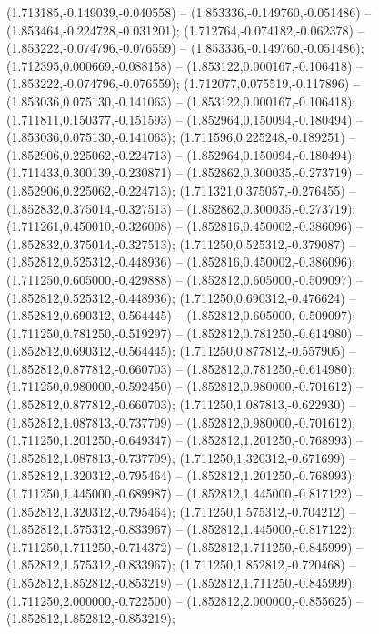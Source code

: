  (1.713185,-0.149039,-0.040558) -- (1.853336,-0.149760,-0.051486) -- (1.853464,-0.224728,-0.031201);
 (1.712764,-0.074182,-0.062378) -- (1.853222,-0.074796,-0.076559) -- (1.853336,-0.149760,-0.051486);
 (1.712395,0.000669,-0.088158) -- (1.853122,0.000167,-0.106418) -- (1.853222,-0.074796,-0.076559);
 (1.712077,0.075519,-0.117896) -- (1.853036,0.075130,-0.141063) -- (1.853122,0.000167,-0.106418);
 (1.711811,0.150377,-0.151593) -- (1.852964,0.150094,-0.180494) -- (1.853036,0.075130,-0.141063);
 (1.711596,0.225248,-0.189251) -- (1.852906,0.225062,-0.224713) -- (1.852964,0.150094,-0.180494);
 (1.711433,0.300139,-0.230871) -- (1.852862,0.300035,-0.273719) -- (1.852906,0.225062,-0.224713);
 (1.711321,0.375057,-0.276455) -- (1.852832,0.375014,-0.327513) -- (1.852862,0.300035,-0.273719);
 (1.711261,0.450010,-0.326008) -- (1.852816,0.450002,-0.386096) -- (1.852832,0.375014,-0.327513);
 (1.711250,0.525312,-0.379087) -- (1.852812,0.525312,-0.448936) -- (1.852816,0.450002,-0.386096);
 (1.711250,0.605000,-0.429888) -- (1.852812,0.605000,-0.509097) -- (1.852812,0.525312,-0.448936);
 (1.711250,0.690312,-0.476624) -- (1.852812,0.690312,-0.564445) -- (1.852812,0.605000,-0.509097);
 (1.711250,0.781250,-0.519297) -- (1.852812,0.781250,-0.614980) -- (1.852812,0.690312,-0.564445);
 (1.711250,0.877812,-0.557905) -- (1.852812,0.877812,-0.660703) -- (1.852812,0.781250,-0.614980);
 (1.711250,0.980000,-0.592450) -- (1.852812,0.980000,-0.701612) -- (1.852812,0.877812,-0.660703);
 (1.711250,1.087813,-0.622930) -- (1.852812,1.087813,-0.737709) -- (1.852812,0.980000,-0.701612);
 (1.711250,1.201250,-0.649347) -- (1.852812,1.201250,-0.768993) -- (1.852812,1.087813,-0.737709);
 (1.711250,1.320312,-0.671699) -- (1.852812,1.320312,-0.795464) -- (1.852812,1.201250,-0.768993);
 (1.711250,1.445000,-0.689987) -- (1.852812,1.445000,-0.817122) -- (1.852812,1.320312,-0.795464);
 (1.711250,1.575312,-0.704212) -- (1.852812,1.575312,-0.833967) -- (1.852812,1.445000,-0.817122);
 (1.711250,1.711250,-0.714372) -- (1.852812,1.711250,-0.845999) -- (1.852812,1.575312,-0.833967);
 (1.711250,1.852812,-0.720468) -- (1.852812,1.852812,-0.853219) -- (1.852812,1.711250,-0.845999);
 (1.711250,2.000000,-0.722500) -- (1.852812,2.000000,-0.855625) -- (1.852812,1.852812,-0.853219);
